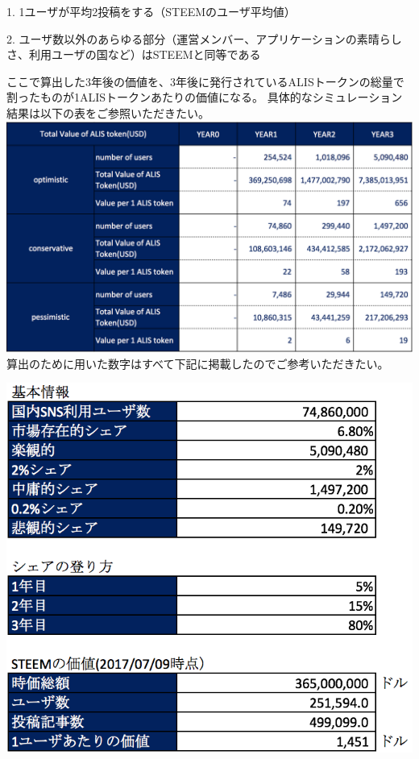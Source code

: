 \documentclass{jsarticle}
\begin{document}
1. 1ユーザが平均2投稿をする（STEEMのユーザ平均値）

2. ユーザ数以外のあらゆる部分（運営メンバー、アプリケーションの素晴らしさ、利用ユーザの国など）はSTEEMと同等である

ここで算出した3年後の価値を、3年後に発行されているALISトークンの総量で割ったものが1ALISトークンあたりの価値になる。
具体的なシミュレーション結果は以下の表をご参照いただきたい。
	\includegraphics[scale=0.6]{img/financialtable.png}
算出のために用いた数字はすべて下記に掲載したのでご参考いただきたい。

\begin{center}
	\includegraphics[scale=0.6]{img/base-info-of-finace.png}
\end{center}
\end{document}

